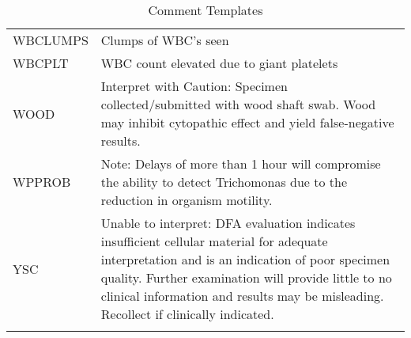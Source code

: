 \begin{fullwidth}
\begin{longtable}{p{.20\linewidth} p{.75\linewidth}}
WBCLUMPS    & Clumps of WBC's seen                                                                                                                                                                                                                                                                         \\
WBCPLT      & WBC count elevated due to giant platelets                                                                                                                                                                                                                                                    \\
WOOD        & Interpret with Caution: Specimen collected/submitted with wood shaft swab. Wood may inhibit cytopathic effect and yield false-negative results.                                                                                                                                              \\
WPPROB      & Note: Delays of more than 1 hour will compromise the ability to detect Trichomonas due to the reduction in organism motility.                                                                                                                                                                \\
YSC         & Unable to interpret: DFA evaluation indicates insufficient cellular material for adequate interpretation and is an indication of poor specimen quality. Further examination will provide little to no clinical information and results may be misleading. Recollect if clinically indicated. \\


    \hline
\caption{Comment Templates}\label{table:comment_templates}
\end{longtable}
\end{fullwidth}

